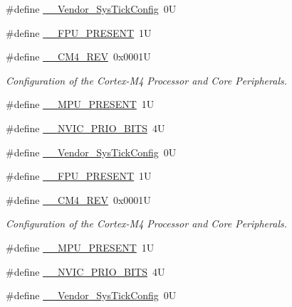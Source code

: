 \begin{DoxyCompactItemize}
\item 
\#define \hyperlink{group___configuration__section__for___c_m_s_i_s_gab58771b4ec03f9bdddc84770f7c95c68}{\+\_\+\+\_\+\+Vendor\+\_\+\+Sys\+Tick\+Config}~0U
\item 
\#define \hyperlink{group___configuration__section__for___c_m_s_i_s_gac1ba8a48ca926bddc88be9bfd7d42641}{\+\_\+\+\_\+\+F\+P\+U\+\_\+\+P\+R\+E\+S\+E\+NT}~1U
\item 
\#define \hyperlink{group___configuration__section__for___c_m_s_i_s_ga45a97e4bb8b6ce7c334acc5f45ace3ba}{\+\_\+\+\_\+\+C\+M4\+\_\+\+R\+EV}~0x0001U
\begin{DoxyCompactList}\small\item\em Configuration of the Cortex-\/\+M4 Processor and Core Peripherals. \end{DoxyCompactList}\item 
\#define \hyperlink{group___configuration__section__for___c_m_s_i_s_ga4127d1b31aaf336fab3d7329d117f448}{\+\_\+\+\_\+\+M\+P\+U\+\_\+\+P\+R\+E\+S\+E\+NT}~1U
\item 
\#define \hyperlink{group___configuration__section__for___c_m_s_i_s_gae3fe3587d5100c787e02102ce3944460}{\+\_\+\+\_\+\+N\+V\+I\+C\+\_\+\+P\+R\+I\+O\+\_\+\+B\+I\+TS}~4U
\item 
\#define \hyperlink{group___configuration__section__for___c_m_s_i_s_gab58771b4ec03f9bdddc84770f7c95c68}{\+\_\+\+\_\+\+Vendor\+\_\+\+Sys\+Tick\+Config}~0U
\item 
\#define \hyperlink{group___configuration__section__for___c_m_s_i_s_gac1ba8a48ca926bddc88be9bfd7d42641}{\+\_\+\+\_\+\+F\+P\+U\+\_\+\+P\+R\+E\+S\+E\+NT}~1U
\item 
\#define \hyperlink{group___configuration__section__for___c_m_s_i_s_ga45a97e4bb8b6ce7c334acc5f45ace3ba}{\+\_\+\+\_\+\+C\+M4\+\_\+\+R\+EV}~0x0001U
\begin{DoxyCompactList}\small\item\em Configuration of the Cortex-\/\+M4 Processor and Core Peripherals. \end{DoxyCompactList}\item 
\#define \hyperlink{group___configuration__section__for___c_m_s_i_s_ga4127d1b31aaf336fab3d7329d117f448}{\+\_\+\+\_\+\+M\+P\+U\+\_\+\+P\+R\+E\+S\+E\+NT}~1U
\item 
\#define \hyperlink{group___configuration__section__for___c_m_s_i_s_gae3fe3587d5100c787e02102ce3944460}{\+\_\+\+\_\+\+N\+V\+I\+C\+\_\+\+P\+R\+I\+O\+\_\+\+B\+I\+TS}~4U
\item 
\#define \hyperlink{group___configuration__section__for___c_m_s_i_s_gab58771b4ec03f9bdddc84770f7c95c68}{\+\_\+\+\_\+\+Vendor\+\_\+\+Sys\+Tick\+Config}~0U

\end{DoxyCompactItemize}
